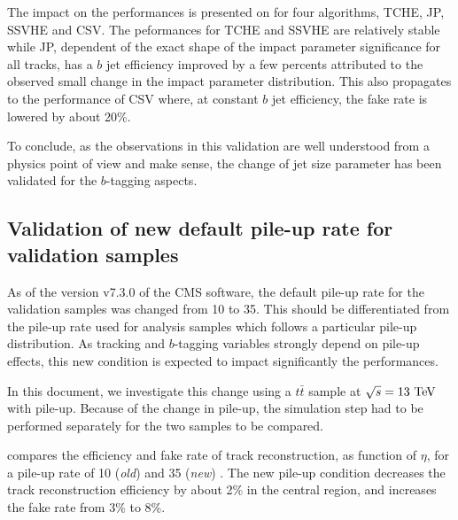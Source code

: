     The impact on the performances is presented on 
    for four algorithms, TCHE, JP, SSVHE and CSV. The peformances for TCHE and SSVHE
    are relatively stable while JP, dependent of the exact shape of the impact parameter
    significance for all tracks, has a $b$ jet efficiency improved by a few percents attributed to the
    observed small change in the impact parameter distribution. This also propagates to the
    performance of CSV where, at constant $b$ jet efficiency, the fake rate is lowered
    by about 20\%.

    To conclude, as the observations in this validation are well understood from a physics
    point of view and make sense, the change of jet size parameter has been validated for
    the $b$-tagging aspects.

    \subsection{Validation of new default pile-up rate for validation samples}

    As of the version v7.3.0 of the CMS software, the default pile-up rate for the validation
    samples was changed from 10 to 35. This should be differentiated from the pile-up rate
    used for analysis samples which follows a particular pile-up distribution.
    As tracking and $b$-tagging variables strongly depend on pile-up effects, this
    new condition is expected to impact significantly the performances.

    In this document, we investigate this change using a $t\bar{t}$ sample at $\sqrt{s} = 13~\text{TeV}$
    with pile-up. Because of the change in pile-up, the simulation step had to be performed
    separately for the two samples to be compared.

     compares the efficiency and fake rate of track
    reconstruction, as function of $\eta$, for a pile-up rate of 10 (\emph{old}) and
    35 (\emph{new}) \cite{TrackingNewPUComparison}. The new pile-up condition decreases the track reconstruction
    efficiency by about 2\% in the central region, and increases the fake rate from
    3\% to 8\%.


